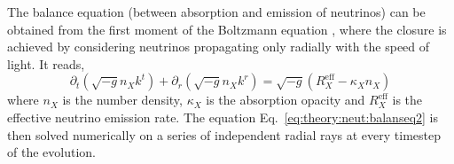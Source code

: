 The balance equation (between absorption and emission of neutrinos) can be obtained from the 
first moment of the Boltzmann equation \citep{Thorne:1981,Shibata:2011kx}, 
where the closure is achieved by considering neutrinos propagating only radially with the 
speed of light. It reads, 
%
\begin{equation}
\label{eq:theory:neut:balanseq2}
\partial_t(\sqrt{-g}n_X k^t) + \partial_r(\sqrt{-g}n_X k^r) = \sqrt{-g}(R^{\text{eff}}_{X} - \kappa_X n_X)
\end{equation}
%
where $n_X$ is the number density, $\kappa_X$ is the absorption opacity and
$R_X^{\text{eff}}$ is the effective neutrino emission rate.
The equation Eq.~\ref{eq:theory:neut:balanseq2} is then solved numerically on a series of 
independent radial rays at every timestep of the evolution.

